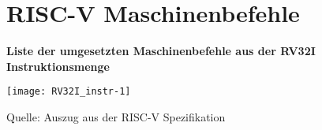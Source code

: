 \chapter{RISC-V Maschinenbefehle} %
\label{Maschinenbefehle} %

\textbf{Liste der umgesetzten Maschinenbefehle aus der RV32I Instruktionsmenge}

\begin{center}
\texttt{[image: RV32I\_instr-1]}
\end{center}
%

Quelle: Auszug aus der RISC-V Spezifikation \cite[S. 54]{RISC}